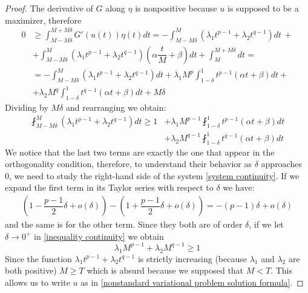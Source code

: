 \documentclass[corpo=11pt, stile=classica, tipotesi=custom,
greek, evenboxes, english]{toptesi}
\numberwithin{equation}{chapter}
\begin{document}
\begin{proof}
The derivative of $G$ along $\eta$ is nonpositive because $u$ is supposed to be a maximizer, therefore
\begin{align*}
	0 &\geq \int_{M-M\delta}^{M+M\delta} G'(u(t))\eta(t)dt = -\int_{M-M\delta}^M \left(\lambda_1 t^{p-1} + \lambda_2 t^{q-1}\right) dt\, +\\
	  &+ \int_{M-M\delta}^M \left(\lambda_1 t^{p-1} + \lambda_2 t^{q-1}\right)\left(\alpha \dfrac{t}{M}+\beta\right) dt + \int_M^{M+M\delta}dt = \\
	  &= -\int_{M-M\delta}^M \left(\lambda_1 t^{p-1} + \lambda_2 t^{q-1}\right) dt + \lambda_1 M^p \int_{1-\delta}^1 t^{p-1}(\alpha t + \beta) dt +\\
	  &+ \lambda_2 M^q \int_{1-\delta}^1 t^{q-1}(\alpha t + \beta) dt + M\delta
\end{align*}
Dividing by $M\delta$ and rearranging we obtain:
\begin{equation}\label{inequality continuity}
	\begin{aligned}
		\fint_{M-M\delta}^M \left(\lambda_1 t^{p-1} + \lambda_2 t^{q-1}\right) dt \geq  1 &+ \lambda_1 M^{p-1} \fint_{1-\delta}^1 t^{p-1}(\alpha t + \beta) dt\\ &+ \lambda_2 M^{q-1} \fint_{1-\delta}^1 t^{q-1}(\alpha t + \beta) dt
	\end{aligned}
\end{equation}
We notice that the last two terms are exactly the one that appear in the orthogonality condition, therefore, to understand their behavior as $\delta$ approaches 0, we need to study the right-hand side of the system \eqref{system continuity}. If we expand the first term in its Taylor series with respect to $\delta$ we have:
\begin{align*}
	\left(1-\dfrac{p-1}{2}\delta + o(\delta) \right) - \left(1+\dfrac{p-1}{2}\delta + o(\delta) \right) = -(p-1)\delta + o(\delta)
\end{align*}
and the same is for the other term. Since they both are of order $\delta$, if we let $\delta \rightarrow 0^+$ in \eqref{inequality continuity} we obtain
\begin{equation*}
	\lambda_1 M^{p-1} + \lambda_2 M^{q-1} \geq 1
\end{equation*}
Since the function $\lambda_1 t^{p-1}  + \lambda_2 t^{q-1}$ is strictly increasing (because $\lambda_1$ and $\lambda_2$ are both positive) $M \geq T$ which is absurd because we supposed that $M<T$. This allows us to write $u$ as in \eqref{nonstandard variational problem solution formula}.


\end{proof}
\end{document}
